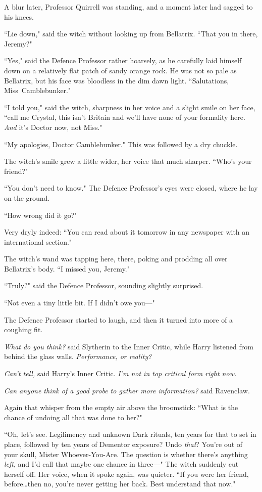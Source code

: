 A blur later, Professor Quirrell was standing, and a moment later had sagged to his knees.

``Lie down," said the witch without looking up from Bellatrix. ``That you in there, Jeremy?"

``Yes," said the Defence Professor rather hoarsely, as he carefully laid himself down on a relatively flat patch of sandy orange rock. He was not so pale as Bellatrix, but his face was bloodless in the dim dawn light. ``Salutations, Miss~Camblebunker."

``I told you," said the witch, sharpness in her voice and a slight smile on her face, ``call me Crystal, this isn't Britain and we'll have none of your formality here. \emph{And} it's Doctor now, not Miss."

``My apologies, Doctor Camblebunker." This was followed by a dry chuckle.

The witch's smile grew a little wider, her voice that much sharper. ``Who's your friend?"

``You don't need to know." The Defence Professor's eyes were closed, where he lay on the ground.

``How wrong did it go?"

Very dryly indeed: ``You can read about it tomorrow in any newspaper with an international section."

The witch's wand was tapping here, there, poking and prodding all over Bellatrix's body. ``I missed you, Jeremy."

``Truly?" said the Defence Professor, sounding slightly surprised.

``Not even a tiny little bit. If I didn't owe you—"

The Defence Professor started to laugh, and then it turned into more of a coughing fit.

\emph{What do you think?} said Slytherin to the Inner Critic, while Harry listened from behind the glass walls. \emph{Performance, or reality?}

\emph{Can't tell,} said Harry's Inner Critic. \emph{I'm not in top critical form right now.}

\emph{Can anyone think of a good probe to gather more information?} said Ravenclaw.

Again that whisper from the empty air above the broomstick: ``What is the chance of undoing all that was done to her?"

``Oh, let's see. Legilimency and unknown Dark rituals, ten years for that to set in place, followed by ten years of Dementor exposure? Undo \emph{that}? You're out of your skull, Mister Whoever-You-Are. The question is whether there's anything \emph{left}, and I'd call that maybe one chance in three—" The witch suddenly cut herself off. Her voice, when it spoke again, was quieter. ``If you were her friend, before…then no, you're never getting her back. Best understand that now."


